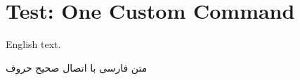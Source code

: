 \documentclass[12pt,a4paper]{article}
\begin{document}
\section*{Test: One Custom Command}

English text.

متن فارسی با اتصال صحیح حروف
\end{document}
